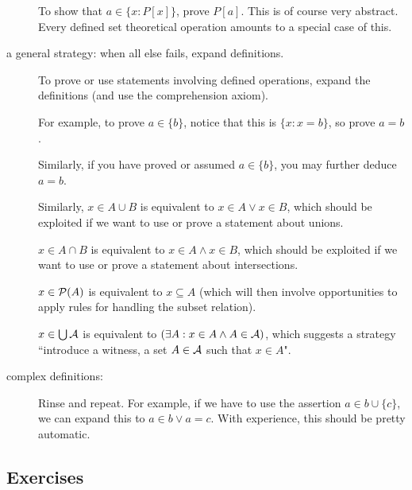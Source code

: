 \documentclass[12pt]{book}
\begin{document}
\begin{description}
To show that $a \in \{x:P[x]\}$, prove $P[a]$.  This is of course very abstract.  Every defined set theoretical operation amounts to a special case of this.

\item[a general strategy:  when all else fails, expand definitions.]

To prove or use statements involving defined operations, expand the definitions (and use the comprehension axiom).

For example, to prove $a \in \{b\}$, notice that this is $\{x:x=b\}$, so prove $a=b$.

Similarly, if you have proved or assumed $a \in \{b\}$, you may further deduce $a=b$.

Similarly, $x \in A \cup B$ is equivalent to $x \in A \vee x \in B$, which should be exploited if we want to use or prove a statement about unions.

$x \in A \cap B$ is equivalent to $x \in A \wedge x \in B$, which should be exploited if we want to use or prove a statement about intersections.


$x \in {\cal P}(A)$ is equivalent to $x \subseteq A$ (which will then involve opportunities to apply rules for handling the subset relation).

$x \in \bigcup {\cal A}$ is equivalent to $(\exists A:x \in A \wedge A \in {\cal A})$, which suggests a strategy ``introduce a witness, a set $A \in {\cal A}$ such that $x \in A$".

\item[complex definitions:]  Rinse and repeat.  For example, if we have to use the assertion $a \in b \cup \{c\}$, we can expand this to $a \in b \vee a = c$.  With experience,
this should be pretty automatic.

\end{description}

\newpage

\subsection{Exercises}
\end{document}
